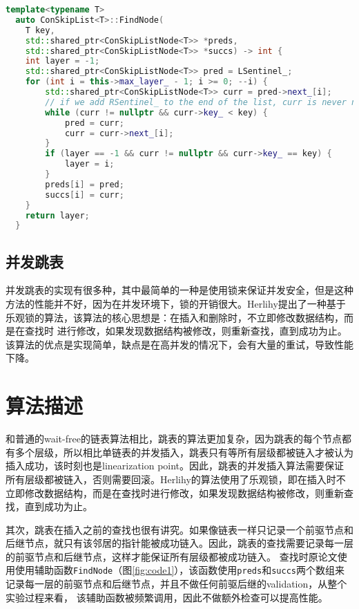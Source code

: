 \documentclass[UTF8, 10pt, twocolumn]{article}
\begin{document}
\begin{figure*}[ht]
  \begin{lstlisting}[language=c++]
  template<typename T>
  auto ConSkipList<T>::FindNode(
    T key, 
    std::shared_ptr<ConSkipListNode<T>> *preds,
    std::shared_ptr<ConSkipListNode<T>> *succs) -> int {
    int layer = -1;
    std::shared_ptr<ConSkipListNode<T>> pred = LSentinel_;
    for (int i = this->max_layer_ - 1; i >= 0; --i) {
        std::shared_ptr<ConSkipListNode<T>> curr = pred->next_[i];
        // if we add RSentinel_ to the end of the list, curr is never nullptr
        while (curr != nullptr && curr->key_ < key) {
            pred = curr;
            curr = curr->next_[i];
        }
        if (layer == -1 && curr != nullptr && curr->key_ == key) {
            layer = i;
        }
        preds[i] = pred;
        succs[i] = curr;
    }
    return layer;
  }
  \end{lstlisting}
  \caption{FindNode函数}
  \label{fig:code1}
\end{figure*}


\subsection{并发跳表}
并发跳表的实现有很多种，其中最简单的一种是使用锁来保证并发安全，但是这种方法的性能并不好，因为在并发环境下，锁的开销很大。Herlihy提出了一种基于乐观锁的算法，该算法的核心思想是：在插入和删除时，不立即修改数据结构，而是在查找时
进行修改，如果发现数据结构被修改，则重新查找，直到成功为止。该算法的优点是实现简单，缺点是在高并发的情况下，会有大量的重试，导致性能下降。

\section{算法描述}
和普通的wait-free的链表算法相比，跳表的算法更加复杂，因为跳表的每个节点都有多个层级，所以相比单链表的并发插入，跳表只有等所有层级都被链入才被认为插入成功，该时刻也是linearization point。因此，跳表的并发插入算法需要保证
所有层级都被链入，否则需要回滚。Herlihy的算法使用了乐观锁，即在插入时不立即修改数据结构，而是在查找时进行修改，如果发现数据结构被修改，则重新查找，直到成功为止。

其次，跳表在插入之前的查找也很有讲究。如果像链表一样只记录一个前驱节点和后继节点，就只有该邻居的指针能被成功链入。因此，跳表的查找需要记录每一层的前驱节点和后继节点，这样才能保证所有层级都被成功链入。
查找时原论文使用使用辅助函数\verb|FindNode|（图\ref{fig:code1}），该函数使用\verb|preds|和\verb|succs|两个数组来记录每一层的前驱节点和后继节点，并且不做任何前驱后继的validation，从整个实验过程来看，
该辅助函数被频繁调用，因此不做额外检查可以提高性能。
\end{document}
